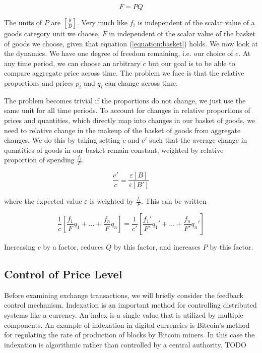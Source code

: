 \[
    F = P Q
\]

The units of $P$ are $\left[ \frac {\$} B \right]$. Very much like $f_i$ is independent of the
scalar value of a goods category unit we choose, $F$ in independent of the scalar value of the
basket of goods we choose, given that equation (\ref{equation:basket}) holds. We now look at the
dynamics. We have one degree of freedom remaining, i.e. our choice of $c$. At any time period, we
can choose an arbitrary $c$ but our goal is to be able to compare aggregate price across time. The
problem we face is that the relative proportions and prices $p_i$ and $q_i$ can change across time.

The problem becomes trivial if the proportions do not change, we just use the same unit for all time
periods. To account for changes in relative proportions of prices and quantities, which directly map
into changes in our basket of goods, we need to relative change in the makeup of the basket of goods
from aggregate changes. We do this by taking setting $c$ and $c'$ such that the average change in
quantities of goods in our basket remain constant, weighted by relative proportion of spending
$ \frac {f_i} F $.

\begin{equation}
    \frac {c'} c = \frac {\varepsilon [ B ]} {\varepsilon [B']}
\end{equation}

where the expected value $\varepsilon$ is weighted by $\frac {f_i} F$. This can be written

\[
    \frac 1 c \left[ \frac {f_1} F q_1 + \dots + \frac {f_n} F q_n \right] =
    \frac 1 {c'} \left[ \frac {f_1'} {F'} q_1' + \dots + \frac {f_n} {F'} q_n' \right]
\]

Increasing $c$ by a factor, reduces $Q$ by this factor, and increases $P$ by this factor.



\subsection{Control of Price Level}

Before examining exchange transactions, we will briefly consider the feedback control mechanism.
Indexation is an important method for controlling distributed systems like a currency. An index is a
single value that is utilized by multiple components. An example of indexation in digital currencies
is Bitcoin's method for regulating the rate of production of blocks by Bitcoin miners. In this case
the indexation is algorithmic rather than controlled by a central authority. TODO

